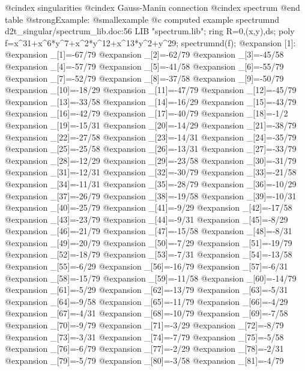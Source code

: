 @cindex singularities
@cindex Gauss-Manin connection
@cindex spectrum
@end table
@strong{Example:}
@smallexample
@c computed example spectrumnd d2t_singular/spectrum_lib.doc:56 
LIB "spectrum.lib";
ring R=0,(x,y),ds;
poly f=x^31+x^6*y^7+x^2*y^12+x^13*y^2+y^29;
spectrumnd(f);
@expansion{} [1]:
@expansion{}    _[1]=-67/79
@expansion{}    _[2]=-62/79
@expansion{}    _[3]=-45/58
@expansion{}    _[4]=-57/79
@expansion{}    _[5]=-41/58
@expansion{}    _[6]=-55/79
@expansion{}    _[7]=-52/79
@expansion{}    _[8]=-37/58
@expansion{}    _[9]=-50/79
@expansion{}    _[10]=-18/29
@expansion{}    _[11]=-47/79
@expansion{}    _[12]=-45/79
@expansion{}    _[13]=-33/58
@expansion{}    _[14]=-16/29
@expansion{}    _[15]=-43/79
@expansion{}    _[16]=-42/79
@expansion{}    _[17]=-40/79
@expansion{}    _[18]=-1/2
@expansion{}    _[19]=-15/31
@expansion{}    _[20]=-14/29
@expansion{}    _[21]=-38/79
@expansion{}    _[22]=-27/58
@expansion{}    _[23]=-14/31
@expansion{}    _[24]=-35/79
@expansion{}    _[25]=-25/58
@expansion{}    _[26]=-13/31
@expansion{}    _[27]=-33/79
@expansion{}    _[28]=-12/29
@expansion{}    _[29]=-23/58
@expansion{}    _[30]=-31/79
@expansion{}    _[31]=-12/31
@expansion{}    _[32]=-30/79
@expansion{}    _[33]=-21/58
@expansion{}    _[34]=-11/31
@expansion{}    _[35]=-28/79
@expansion{}    _[36]=-10/29
@expansion{}    _[37]=-26/79
@expansion{}    _[38]=-19/58
@expansion{}    _[39]=-10/31
@expansion{}    _[40]=-25/79
@expansion{}    _[41]=-9/29
@expansion{}    _[42]=-17/58
@expansion{}    _[43]=-23/79
@expansion{}    _[44]=-9/31
@expansion{}    _[45]=-8/29
@expansion{}    _[46]=-21/79
@expansion{}    _[47]=-15/58
@expansion{}    _[48]=-8/31
@expansion{}    _[49]=-20/79
@expansion{}    _[50]=-7/29
@expansion{}    _[51]=-19/79
@expansion{}    _[52]=-18/79
@expansion{}    _[53]=-7/31
@expansion{}    _[54]=-13/58
@expansion{}    _[55]=-6/29
@expansion{}    _[56]=-16/79
@expansion{}    _[57]=-6/31
@expansion{}    _[58]=-15/79
@expansion{}    _[59]=-11/58
@expansion{}    _[60]=-14/79
@expansion{}    _[61]=-5/29
@expansion{}    _[62]=-13/79
@expansion{}    _[63]=-5/31
@expansion{}    _[64]=-9/58
@expansion{}    _[65]=-11/79
@expansion{}    _[66]=-4/29
@expansion{}    _[67]=-4/31
@expansion{}    _[68]=-10/79
@expansion{}    _[69]=-7/58
@expansion{}    _[70]=-9/79
@expansion{}    _[71]=-3/29
@expansion{}    _[72]=-8/79
@expansion{}    _[73]=-3/31
@expansion{}    _[74]=-7/79
@expansion{}    _[75]=-5/58
@expansion{}    _[76]=-6/79
@expansion{}    _[77]=-2/29
@expansion{}    _[78]=-2/31
@expansion{}    _[79]=-5/79
@expansion{}    _[80]=-3/58
@expansion{}    _[81]=-4/79
